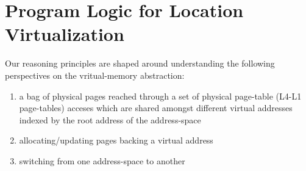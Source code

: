 \section{Program Logic for Location Virtualization}
\label{sec:logic}
\newcommand{\gammaPred}{\delta}

\newcommand{\sumwalkabs}[3]{
  \ownGhost\gammaPred{\authfrag{\singletonMap{#1}{(#2, #3)}}}
}
\newcommand{\ptableabswalk}[1]{\mathcal{A}\textsf{bsPTableWalk}(#1)}
\newcommand{\ptablestore}{\theta}
Our reasoning principles are shaped around understanding the following perspectives on the vritual-memory abstraction:
\begin{enumerate}
\item a bag of physical pages reached through a set of physical page-table (L4-L1 page-tables) acceses which are shared amongst different virtual addresses indexed by the root address of the address-space 
\item allocating/updating pages backing a virtual address 
\item switching from one address-space to another 
\end{enumerate}
